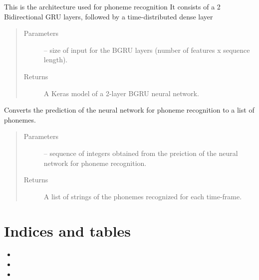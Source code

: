 \documentclass[letterpaper,10pt,english]{sphinxmanual}
\begin{document}
\begin{fulllineitems}
\begin{fulllineitems}
\end{fulllineitems}


\begin{fulllineitems}
\label{\detokenize{index:phonet.Phonet.modelp}}
This is the architecture used for phoneme recognition
It consists of a 2 Bidirectional GRU layers, followed by a time-distributed dense layer
\begin{quote}\begin{description}
\item[{Parameters}] \leavevmode
{} -- size of input for the BGRU layers (number of features x sequence length).

\item[{Returns}] \leavevmode
A Keras model of a 2-layer BGRU neural network.

\end{description}\end{quote}

\end{fulllineitems}


\begin{fulllineitems}
\label{\detokenize{index:phonet.Phonet.number2phoneme}}
Converts the prediction of the neural network for phoneme recognition to a list of phonemes.
\begin{quote}\begin{description}
\item[{Parameters}] \leavevmode
{} -- sequence of integers obtained from the preiction of the neural network for phoneme recognition.

\item[{Returns}] \leavevmode
A list of strings of the phonemes recognized for each time-frame.

\end{description}\end{quote}

\end{fulllineitems}


\end{fulllineitems}



\chapter{Indices and tables}
\label{\detokenize{index:indices-and-tables}}\begin{itemize}
\item {} 

\item {} 

\item {} 

\end{itemize}
\end{document}
